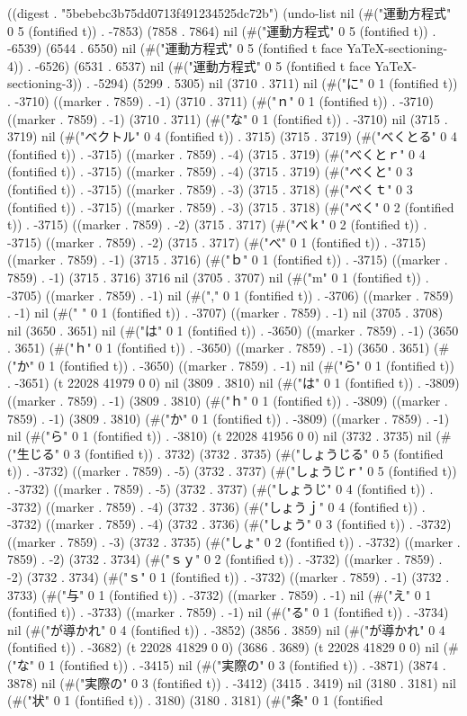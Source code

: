 
((digest . "5bebebc3b75dd0713f491234525dc72b") (undo-list nil (#("運動方程式" 0 5 (fontified t)) . -7853) (7858 . 7864) nil (#("運動方程式" 0 5 (fontified t)) . -6539) (6544 . 6550) nil (#("運動方程式" 0 5 (fontified t face YaTeX-sectioning-4)) . -6526) (6531 . 6537) nil (#("運動方程式" 0 5 (fontified t face YaTeX-sectioning-3)) . -5294) (5299 . 5305) nil (3710 . 3711) nil (#("に" 0 1 (fontified t)) . -3710) ((marker . 7859) . -1) (3710 . 3711) (#("ｎ" 0 1 (fontified t)) . -3710) ((marker . 7859) . -1) (3710 . 3711) (#("な" 0 1 (fontified t)) . -3710) nil (3715 . 3719) nil (#("ベクトル" 0 4 (fontified t)) . 3715) (3715 . 3719) (#("べくとる" 0 4 (fontified t)) . -3715) ((marker . 7859) . -4) (3715 . 3719) (#("べくとｒ" 0 4 (fontified t)) . -3715) ((marker . 7859) . -4) (3715 . 3719) (#("べくと" 0 3 (fontified t)) . -3715) ((marker . 7859) . -3) (3715 . 3718) (#("べくｔ" 0 3 (fontified t)) . -3715) ((marker . 7859) . -3) (3715 . 3718) (#("べく" 0 2 (fontified t)) . -3715) ((marker . 7859) . -2) (3715 . 3717) (#("べｋ" 0 2 (fontified t)) . -3715) ((marker . 7859) . -2) (3715 . 3717) (#("べ" 0 1 (fontified t)) . -3715) ((marker . 7859) . -1) (3715 . 3716) (#("ｂ" 0 1 (fontified t)) . -3715) ((marker . 7859) . -1) (3715 . 3716) 3716 nil (3705 . 3707) nil (#("m" 0 1 (fontified t)) . -3705) ((marker . 7859) . -1) nil (#("," 0 1 (fontified t)) . -3706) ((marker . 7859) . -1) nil (#(" " 0 1 (fontified t)) . -3707) ((marker . 7859) . -1) nil (3705 . 3708) nil (3650 . 3651) nil (#("は" 0 1 (fontified t)) . -3650) ((marker . 7859) . -1) (3650 . 3651) (#("ｈ" 0 1 (fontified t)) . -3650) ((marker . 7859) . -1) (3650 . 3651) (#("か" 0 1 (fontified t)) . -3650) ((marker . 7859) . -1) nil (#("ら" 0 1 (fontified t)) . -3651) (t 22028 41979 0 0) nil (3809 . 3810) nil (#("は" 0 1 (fontified t)) . -3809) ((marker . 7859) . -1) (3809 . 3810) (#("ｈ" 0 1 (fontified t)) . -3809) ((marker . 7859) . -1) (3809 . 3810) (#("か" 0 1 (fontified t)) . -3809) ((marker . 7859) . -1) nil (#("ら" 0 1 (fontified t)) . -3810) (t 22028 41956 0 0) nil (3732 . 3735) nil (#("生じる" 0 3 (fontified t)) . 3732) (3732 . 3735) (#("しょうじる" 0 5 (fontified t)) . -3732) ((marker . 7859) . -5) (3732 . 3737) (#("しょうじｒ" 0 5 (fontified t)) . -3732) ((marker . 7859) . -5) (3732 . 3737) (#("しょうじ" 0 4 (fontified t)) . -3732) ((marker . 7859) . -4) (3732 . 3736) (#("しょうｊ" 0 4 (fontified t)) . -3732) ((marker . 7859) . -4) (3732 . 3736) (#("しょう" 0 3 (fontified t)) . -3732) ((marker . 7859) . -3) (3732 . 3735) (#("しょ" 0 2 (fontified t)) . -3732) ((marker . 7859) . -2) (3732 . 3734) (#("ｓｙ" 0 2 (fontified t)) . -3732) ((marker . 7859) . -2) (3732 . 3734) (#("ｓ" 0 1 (fontified t)) . -3732) ((marker . 7859) . -1) (3732 . 3733) (#("与" 0 1 (fontified t)) . -3732) ((marker . 7859) . -1) nil (#("え" 0 1 (fontified t)) . -3733) ((marker . 7859) . -1) nil (#("る" 0 1 (fontified t)) . -3734) nil (#("が導かれ" 0 4 (fontified t)) . -3852) (3856 . 3859) nil (#("が導かれ" 0 4 (fontified t)) . -3682) (t 22028 41829 0 0) (3686 . 3689) (t 22028 41829 0 0) nil (#("な" 0 1 (fontified t)) . -3415) nil (#("実際の" 0 3 (fontified t)) . -3871) (3874 . 3878) nil (#("実際の" 0 3 (fontified t)) . -3412) (3415 . 3419) nil (3180 . 3181) nil (#("状" 0 1 (fontified t)) . 3180) (3180 . 3181) (#("条" 0 1 (fontified 